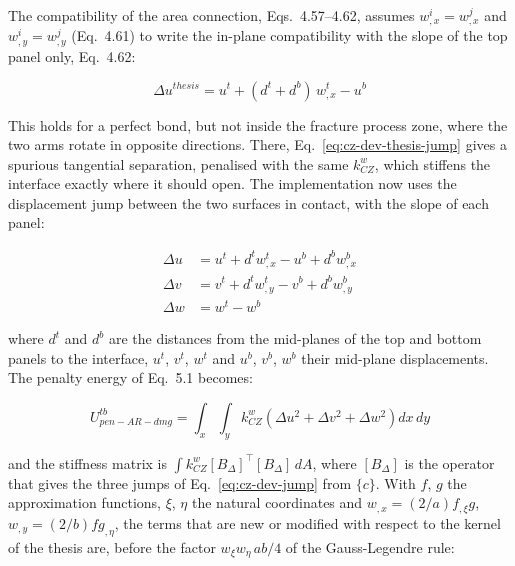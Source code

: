 The compatibility of the area connection, Eqs.~4.57--4.62, assumes $w^i_{,x} = w^j_{,x}$ and $w^i_{,y} = w^j_{,y}$ (Eq.~4.61) to write the in-plane compatibility with the slope of the top panel only, Eq.~4.62:

\begin{equation}\label{eq:cz-dev-thesis-jump}
	\Delta u^{thesis} = u^t + (d^t + d^b) \, w^t_{,x} - u^b
\end{equation}

This holds for a perfect bond, but not inside the fracture process zone, where the two arms rotate in opposite directions. There, Eq.~\ref{eq:cz-dev-thesis-jump} gives a spurious tangential separation, penalised with the same $k^w_{CZ}$, which stiffens the interface exactly where it should open. The implementation now uses the displacement jump between the two surfaces in contact, with the slope of each panel:

\begin{equation}\label{eq:cz-dev-jump}
	\begin{aligned}
		\Delta u &= u^t + d^t w^t_{,x} - u^b + d^b w^b_{,x} \\
		\Delta v &= v^t + d^t w^t_{,y} - v^b + d^b w^b_{,y} \\
		\Delta w &= w^t - w^b
	\end{aligned}
\end{equation}

\noindent where $d^t$ and $d^b$ are the distances from the mid-planes of the top and bottom panels to the interface, $u^t$, $v^t$, $w^t$ and $u^b$, $v^b$, $w^b$ their mid-plane displacements. The penalty energy of Eq.~5.1 becomes:

\begin{equation}\label{eq:cz-dev-energy}
	U^{tb}_{pen-AR-dmg} = \int_x \int_y k^w_{CZ} \left( \Delta u^2 + \Delta v^2 + \Delta w^2 \right) dx\,dy
\end{equation}

\noindent and the stiffness matrix is $\int k^w_{CZ} [B_\Delta]^\top [B_\Delta] \, dA$, where $[B_\Delta]$ is the operator that gives the three jumps of Eq.~\ref{eq:cz-dev-jump} from $\{c\}$. With $f$, $g$ the approximation functions, $\xi$, $\eta$ the natural coordinates and $w_{,x} = (2/a) f_{,\xi} g$, $w_{,y} = (2/b) f g_{,\eta}$, the terms that are new or modified with respect to the kernel of the thesis are, before the factor $w_\xi w_\eta \, ab/4$ of the Gauss-Legendre rule:

